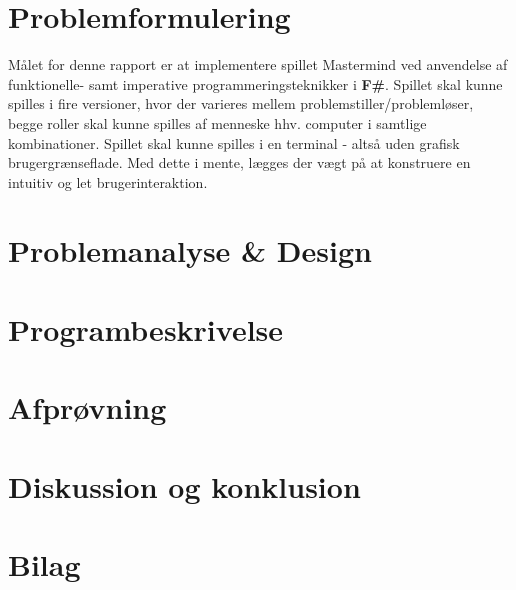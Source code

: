 \documentclass[a4paper,10pt]{article}
\begin{document}
\section{Problemformulering}

Målet for denne rapport er at implementere spillet Mastermind ved anvendelse af funktionelle- samt imperative programmeringsteknikker i \textbf{F\#}. Spillet skal kunne spilles i fire versioner, hvor der varieres mellem problemstiller/problemløser, begge roller skal kunne spilles af menneske hhv. computer i samtlige kombinationer. Spillet skal kunne spilles i en terminal - altså uden grafisk brugergrænseflade. Med dette i mente, lægges der vægt på at konstruere en intuitiv og let brugerinteraktion. 

\section{Problemanalyse \& Design}



\section{Programbeskrivelse}

\section{Afprøvning}

\section{Diskussion og konklusion}

\section*{Bilag}
\end{document}

